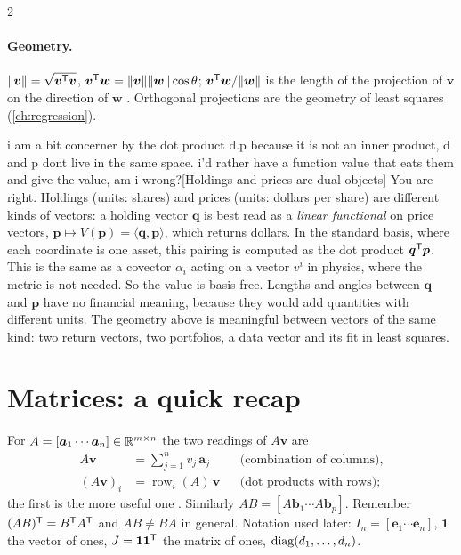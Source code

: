 \begin{paracol}{2}
\paragraph{Geometry.} $\|\bm v\| = \sqrt{\bm v^{\mathsf T}\bm v}$, $\bm v^{\mathsf T}\bm w = \|\bm v\|\|\bm w\|\cos\theta$;
$\bm v^{\mathsf T}\bm w/\|\bm w\|$ is the length of the projection of $\bm v$ on the direction of $\bm w$
. Orthogonal projections are the geometry of least squares (\cref{ch:regression}).\begin{answer}{i am a bit concerner by the dot product d.p because it is not an inner product, d and p dont live in the same space. i'd rather have a function value that eats them and give the value, am i wrong?}[Holdings and prices are dual objects]
You are right. Holdings (units: shares) and prices (units: dollars per share) are different kinds of
vectors: a holding vector $\bm q$ is best read as a \emph{linear functional} on price vectors,
$\bm p\mapsto V(\bm p)=\langle\bm q,\bm p\rangle$, which returns dollars. In the standard basis, where
each coordinate is one asset, this pairing is computed as the dot product $\bm q^{\mathsf T}\bm p$. This is
the same as a covector $\alpha_i$ acting on a vector $v^i$ in physics, where the metric is not needed.
So the value is basis-free. Lengths and angles between $\bm q$ and $\bm p$ have no financial meaning,
because they would add quantities with different units. The geometry above is meaningful between vectors of the
same kind: two return vectors, two portfolios, a data vector and its fit in least squares.
\end{answer}

\section{Matrices: a quick recap}\label{sec:la-matrices}
For $A=[\bm a_1\cdots\bm a_n]\in\mathbb{R}^{m\times n}$ the two readings of $A\bm v$ are
\begin{align*}
  A\bm v &= \textstyle\sum_{j=1}^n v_j\,\bm a_j && \text{(combination of columns)},\\
  (A\bm v)_i &= \operatorname{row}_i(A)\,\bm v && \text{(dot products with rows)};
\end{align*}
the first is the more useful one . Similarly $AB=[A\bm b_1\cdots A\bm b_p]$.
Remember $(AB)^{\mathsf T}=B^{\mathsf T} A^{\mathsf T}$ and $AB\neq BA$ in general. Notation used later: $I_n=[\bm e_1\cdots\bm e_n]$,
$\bm 1$ the vector of ones, $J=\bm 1\bm 1^{\mathsf T}$ the matrix of ones, $\operatorname{diag}(d_1,\dots,d_n)$.


\end{paracol}
